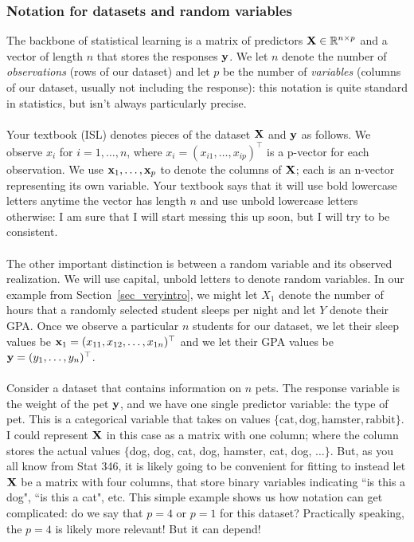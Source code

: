 \documentclass[titlepage,10pt]{scrartcl}
\begin{document}
\subsubsection{Notation for datasets and random variables}

The backbone of statistical learning is a matrix of predictors $\bold{X} \in \mathbb{R}^{n \times p}$ and a vector of length $n$ that stores the responses $\bold{y}$. We let $n$ denote the number of \emph{observations} (rows of our dataset) and let $p$ be the number of \emph{variables} (columns of our dataset, usually not including the response): this notation is quite standard in statistics, but isn't always particularly precise. \\
\\
Your textbook (ISL) denotes pieces of the dataset $\bold{X}$ and $\bold{y}$ as follows. We observe $x_i$ for $i = 1,\ldots,n$, where $x_i = (x_{i1}, \ldots, x_{ip})^\top$ is a p-vector for each observation. We use $\bold{x}_1,\ldots,\bold{x}_{p}$ to denote the columns of $\bold{X}$; each is an n-vector representing its own variable. Your textbook says that it will use bold lowercase letters anytime the vector has length $n$ and use unbold lowercase letters otherwise: I am sure that I will start messing this up soon, but I will try to be consistent. \\
\\
The other important distinction is between a random variable and its observed realization. We will use capital, unbold letters to denote random variables. In our example from Section~\ref{sec_veryintro}, we might let $X_1$ denote the number of hours that a randomly selected student sleeps per night and let $Y$ denote their GPA. Once we observe a particular $n$ students for our dataset, we let their sleep values be $\bold{x}_1 = (x_{11}, x_{12},\ldots, x_{1n})^\top$ and we let their GPA values be $\bold{y} = (y_1,\ldots,y_{n})^\top$.  \\
\\
Consider a dataset that contains information on $n$ pets. The response variable is the weight of the pet $\bold{y}$, and we have one single predictor variable: the type of pet. This is a categorical variable that takes on values $\{ \text{cat}, \text{dog}, \text{hamster}, \text{rabbit} \}$. I could represent $\bold{X}$ in this case as a matrix with one column; where the column stores the actual values $\{$dog, dog, cat, dog, hamster, cat, dog, $\ldots \}$.  But, as you all know from Stat 346, it is likely going to be convenient for fitting to instead let $\bold{X}$ be a matrix with four columns, that store binary variables indicating ``is this a dog", ``is this a cat", etc. This simple example shows us how notation can get complicated: do we say that $p=4$ or $p=1$ for this dataset? Practically speaking, the $p=4$ is likely more relevant! But it can depend!  \\
\end{document}
